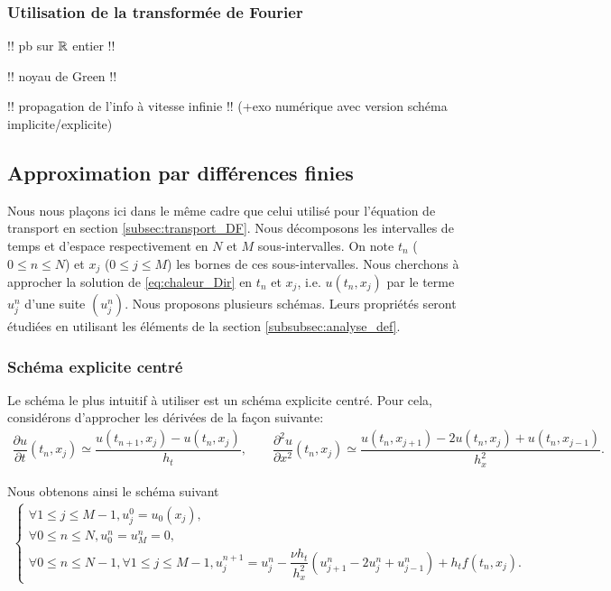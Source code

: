 \documentclass[12pt,a4paper,twoside]{article}
\begin{document}
\subsubsection{Utilisation de la transform\'ee de Fourier}


!! pb sur $\mathbb{R}$ entier !!

!! noyau de Green !!

!! propagation de l'info \`a vitesse infinie !!
(+exo num\'erique avec version sch\'ema implicite/explicite)

\subsection{Approximation par diff\'erences finies}


Nous nous pla\c{c}ons ici dans le m\^eme cadre que celui utilis\'e pour 
l'\'equation de transport en section \ref{subsec:transport_DF}.
Nous d\'ecomposons les intervalles de temps et d'espace
respectivement en $N$ et $M$ sous-intervalles.
On note $t_n$ ($0 \leq n \leq N$) et $x_j$ ($0 \leq j \leq M$)
les bornes de ces sous-intervalles.
Nous cherchons \`a approcher la solution de \eqref{eq:chaleur_Dir}
en $t_n$ et $x_j$, i.e. $u(t_n,x_j)$ par le terme $u_j^n$ d'une suite
$(u_j^n)$. 
Nous proposons plusieurs sch\'emas.
Leurs propri\'et\'es seront \'etudi\'ees en utilisant les 
\'el\'ements de la section \ref{subsubsec:analyse_def}.


\subsubsection{Sch\'ema explicite centr\'e}

Le sch\'ema le plus intuitif \`a utiliser est un sch\'ema 
explicite centr\'e.
Pour cela, consid\'erons d'approcher les d\'eriv\'ees de la fa\c{c}on suivante:
\begin{align*}
  \dfrac{\partial u}{\partial t}(t_n,x_j) \simeq \dfrac{u(t_{n+1},x_j) - u(t_n,x_j)}{h_t} ,
  \qquad 
  \dfrac{\partial^2 u}{\partial x^2}(t_n,x_j) 
  \simeq \dfrac{u(t_{n},x_{j+1}) - 2 u(t_n,x_j) + u(t_n,x_{j-1})}{h_x^2} .
\end{align*}


Nous obtenons ainsi le sch\'ema suivant
\begin{align}
  \label{eq:chaleur_DF_exp_centre}
  \left\{
  \begin{array}{l}
    \forall 1 \leq j \leq M-1 , 
    u_j^0 = u_0(x_j) ,
    \\
    \forall 0 \leq n \leq N, u_0^n = u_M^n = 0 ,
    \\
    \forall 0 \leq n \leq N-1, \forall 1 \leq j \leq M-1,
    u_j^{n+1} = u_j^{n} - \dfrac{\nu h_t}{h_x^2} (u_{j+1}^{n} - 2 u_{j}^{n} + u_{j-1}^{n} ) 
    + h_t f(t_n,x_j) .
  \end{array}
  \right.
\end{align}
\end{document}
